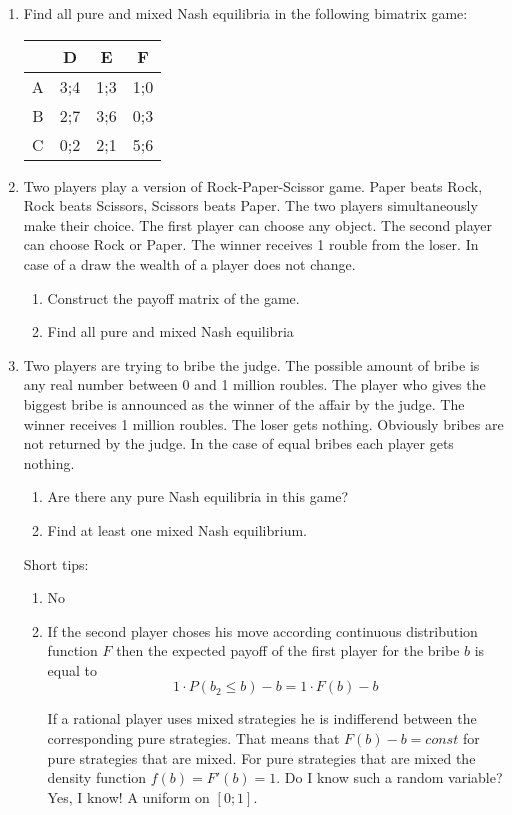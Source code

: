 \begin{enumerate}[resume]
\item Find all pure and mixed Nash equilibria in the following bimatrix game:


\begin{tabular}{c|ccc}
 & D & E & F \\
\hline
A & 3;4 & 1;3 & 1;0  \\
B & 2;7 & 3;6 & 0;3  \\
C & 0;2 & 2;1 & 5;6  \\
\end{tabular}
\item Two players play a version of Rock-Paper-Scissor game. Paper beats Rock, Rock beats Scissors, Scissors beats Paper. The two players simultaneously make their choice. The first player can choose any object. The second player can choose Rock or Paper. The winner receives 1 rouble from the loser. In case of a draw the wealth of a player does not change.
\begin{enumerate}
\item Construct the payoff matrix of the game.
\item Find all pure and mixed Nash equilibria
\end{enumerate}
\item Two players are trying to bribe the judge. The possible amount of bribe is any real number between 0 and 1 million roubles. The player who gives the biggest bribe is announced as the winner of the affair by the judge. The winner receives 1 million roubles. The loser gets nothing. Obviously bribes are not returned by the judge. In the case of equal bribes each player gets nothing.
\begin{enumerate}
\item Are there any pure Nash equilibria in this game?
\item Find at least one mixed Nash equilibrium.
\end{enumerate}

Short tips:
\begin{enumerate}
\item No
\item If the second player choses his move according continuous distribution function $F$ then the expected payoff of the first player for the bribe $b$ is equal to
\[
1\cdot P(b_2 \leq b) - b = 1\cdot F(b)-b
\]

If a rational player uses mixed strategies he is indifferend between the corresponding pure strategies. That means that $F(b)-b=const$ for pure strategies that are mixed. For pure strategies that are mixed the density function $f(b)=F'(b)=1$. Do I know such a random variable? Yes, I know! A uniform on $[0;1]$.

\end{enumerate}

\end{enumerate}


